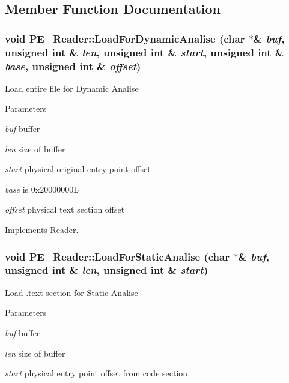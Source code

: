 \subsection{Member Function Documentation}
\hypertarget{classPE__Reader_ad11f69fdbf231385c9ff7edd26913af7}{
\subsubsection[{LoadForDynamicAnalise}]{\setlength{\rightskip}{0pt plus 5cm}void PE\_\-Reader::LoadForDynamicAnalise (char $\ast$\& {\em buf}, \/  unsigned int \& {\em len}, \/  unsigned int \& {\em start}, \/  unsigned int \& {\em base}, \/  unsigned int \& {\em offset})}}
\label{classPE__Reader_ad11f69fdbf231385c9ff7edd26913af7}
Load entire file for Dynamic Analise 
\begin{DoxyParams}{Parameters}
\item[{\em buf}]buffer \item[{\em len}]size of buffer \item[{\em start}]physical original entry point offset \item[{\em base}]is 0x20000000L \item[{\em offset}]physical text section offset \end{DoxyParams}


Implements \hyperlink{classReader_a0fe4ac206880263e042c5277370c679b}{Reader}.

\hypertarget{classPE__Reader_a4b5e1c738c887247181c4e3d0f253c27}{
\subsubsection[{LoadForStaticAnalise}]{\setlength{\rightskip}{0pt plus 5cm}void PE\_\-Reader::LoadForStaticAnalise (char $\ast$\& {\em buf}, \/  unsigned int \& {\em len}, \/  unsigned int \& {\em start})}}
\label{classPE__Reader_a4b5e1c738c887247181c4e3d0f253c27}
Load .text section for Static Analise 
\begin{DoxyParams}{Parameters}
\item[{\em buf}]buffer \item[{\em len}]size of buffer \item[{\em start}]physical entry point offset from code section \end{DoxyParams}


